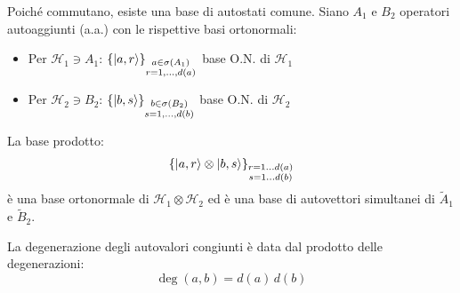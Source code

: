 Poiché commutano, esiste una base di autostati comune.
Siano \(A_1\) e \(B_2\) operatori autoaggiunti (a.a.) con le rispettive basi ortonormali:
\begin{itemize}
    \item Per \(\mathcal{H}_1 \ni A_1\): \(\left\{ \ket{a, r} \right\}_{\substack{a \in \sigma(A_1) \\ r=1,\dots,d(a)}}\) base O.N. di \(\mathcal{H}_1\)
    \item Per \(\mathcal{H}_2 \ni B_2\): \(\left\{ \ket{b, s} \right\}_{\substack{b \in \sigma(B_2) \\ s=1,\dots,d(b)}}\) base O.N. di \(\mathcal{H}_2\)
\end{itemize}

La base prodotto:
\begin{equation}
    \left\{ \ket{a, r} \otimes \ket{b, s} \right\}_{\substack{r=1\dots d(a) \\ s=1\dots d(b)}}
\end{equation}
è una base ortonormale di \(\mathcal{H}_1 \otimes \mathcal{H}_2\) ed è una base di autovettori simultanei di \(\tilde{A}_1\) e \(\tilde{B}_2\).

La degenerazione degli autovalori congiunti è data dal prodotto delle degenerazioni:
\[
    \deg(a, b) = d(a)\,d(b)
\]

